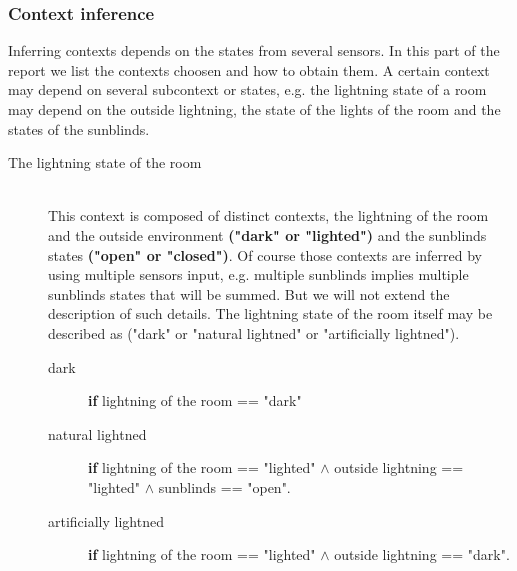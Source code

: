\documentclass{acm_proc_article-sp}
\begin{document}
\subsubsection{Context inference}
Inferring contexts depends on the states from several sensors. In this part of the report we list the contexts choosen and how to obtain them.
A certain context may depend on several subcontext or states, 
e.g. the lightning state of a room may depend on the outside lightning, the state of the lights of the room and the states of the sunblinds.
\begin{description}
 \item[The lightning state of the room]\hfill \\ 
 This context is composed of distinct contexts, the lightning of the room and the outside environment \textbf{("dark" or "lighted")} and the sunblinds states \textbf{("open" or "closed")}. 
 Of course those contexts are inferred by using multiple sensors input, e.g. multiple sunblinds implies multiple sunblinds states that will be summed. But we will not extend the description of such details.
 The lightning state of the room itself may be described as ("dark" or "natural lightned" or "artificially lightned").
 \begin{description}
  \item[dark] \textbf{if} lightning of the room == "dark"
  \item[natural lightned] \textbf{if} lightning of the room == "lighted" $\land$ outside lightning == "lighted" $\land$ sunblinds == "open".
  \item[artificially lightned] \textbf{if} lightning of the room == "lighted" $\land$ outside lightning == "dark".
 \end{description}
 

\end{description}
\end{document}
